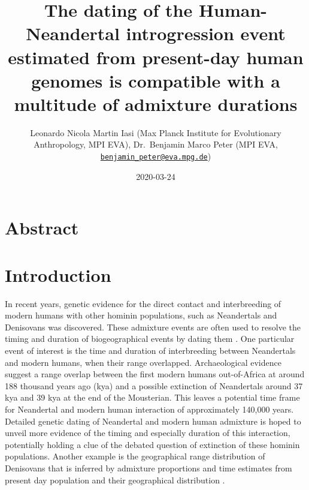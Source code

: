 \documentclass[]{article}
\title{The dating of the Human-Neandertal introgression event estimated from present-day human genomes is compatible with a multitude of admixture durations}
\author{Leonardo Nicola Martin Iasi (Max Planck Institute for Evolutionary
Anthropology, MPI EVA), Dr.~Benjamin Marco Peter (MPI EVA,
\href{mailto:benjamin_peter@eva.mpg.de}{\nolinkurl{benjamin\_peter@eva.mpg.de}})}
\date{2020-03-24}
\begin{document}
\maketitle

\section{Abstract}\label{abstract}

\section{Introduction}\label{introduction}

In recent years, genetic evidence for the direct contact and interbreeding of modern humans with other hominin populations, such as Neandertals \citep{green_draft_2010,prufer_complete_2013,vernot_resurrecting_2014,fu_early_2015,fu_genome_2014,sankararaman_genomic_2014,prufer_high-coverage_2017} and Denisovans \citep{reich_genetic_2010,meyer_high-coverage_2012,sankararaman_combined_2016,vernot_excavating_2016,malaspinas_genomic_2016} was discovered. These admixture events are often used to resolve the timing and duration of biogeographical events by dating them \citep{sankararaman_date_2012,jacobs_multiple_2019,vyas_analyses_2019}. One particular event of interest is the time and duration of interbreeding between Neandertals and modern humans, when their range overlapped. Archaeological evidence suggest a range overlap between the first modern humans out-of-Africa at around 188 thousand years ago (kya) \citep{stringer_when_2018,hershkovitz_earliest_2018} and a possible extinction of Neandertals around 37 kya \citep{zilhao_precise_2017} and 39 kya \citep{higham_timing_2014} at the end of the Mousterian. This leaves a potential time frame for Neandertal and modern human interaction of approximately 140,000 years. Detailed genetic dating of Neandertal and modern human admixture is hoped to unveil more evidence of the timing and especially duration of this interaction,
potentially holding a clue of the debated question of extinction of these hominin populations. Another example is the geographical range distribution of Denisovans that is inferred by admixture proportions and time estimates from present day population and their geographical distribution \citep{jacobs_multiple_2019}. 
\end{document}
